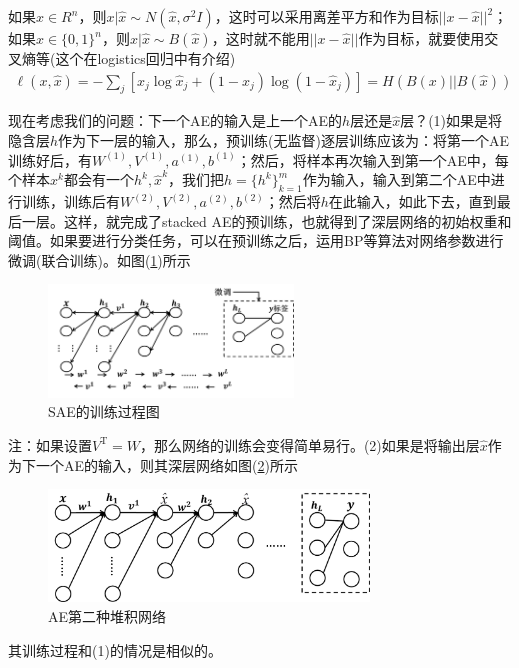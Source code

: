         \par
        如果$x\in R^n$，则$x|\hat{x} \sim N(\hat{x},\sigma^2I)$，这时可以采用离差平方和作为目标$||x-\hat{x}||^2$；如果$x\in \{0,1\}^n$，则$x|\hat{x}\sim B(\hat{x})$，这时就不能用$||x-\hat{x}||$作为目标，就要使用交叉熵等(这个在logistics回归中有介绍)
        \begin{align*}
        \ell (x,\hat{x}) = -\sum_j \left[ x_j\log \hat{x}_j + (1-x_j)\log (1-\hat{x}_j)  \right] = H(B(x)||B(\hat{x}))
        \end{align*}
        \par
        现在考虑我们的问题：下一个AE的输入是上一个AE的$h$层还是$\hat{x}$层？(1)如果是将隐含层$h$作为下一层的输入，那么，预训练(无监督)逐层训练应该为：将第一个AE训练好后，有$W^{(1)},V^{(1)},a^{(1)},b^{(1)}$；然后，将样本再次输入到第一个AE中，每个样本$x^k$都会有一个$h^k,\hat{x}^k$，我们把$h = \{h^k\}_{k=1}^m$作为输入，输入到第二个AE中进行训练，训练后有$W^{(2)},V^{(2)},a^{(2)},b^{(2)}$；然后将$h$在此输入，如此下去，直到最后一层。这样，就完成了stacked AE的预训练，也就得到了深层网络的初始权重和阈值。如果要进行分类任务，可以在预训练之后，运用BP等算法对网络参数进行微调(联合训练)。如图(\ref{fig:SAE的训练过程图})所示
            \begin{figure}[H]
            \centering
            \includegraphics[height=3cm]{images/SAE_training_process.jpg}
            \caption{SAE的训练过程图}
            \label{fig:SAE的训练过程图}
            \end{figure}
        注：如果设置$V^\mathrm{T} = W$，那么网络的训练会变得简单易行。(2)如果是将输出层$\hat{x}$作为下一个AE的输入，则其深层网络如图(\ref{fig:AE第二种堆积网络})所示
            \begin{figure}[H]
            \centering
            \includegraphics[height=3cm]{images/the_second_accumulation_net_of_AE.jpg}
            \caption{AE第二种堆积网络}
            \label{fig:AE第二种堆积网络}
            \end{figure}
        其训练过程和(1)的情况是相似的。
